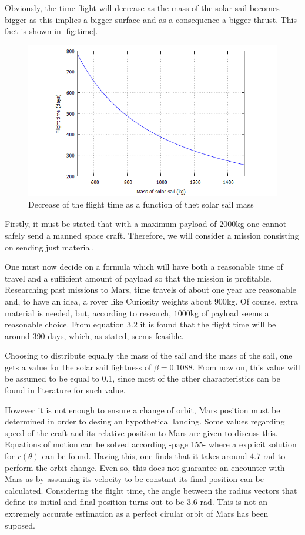 \documentclass[twocolumn,12pt,a4paper]{article}
\numberwithin{equation}{section}
\begin{document}
Obviously, the time flight will decrease as the mass of the solar sail becomes bigger as this implies a bigger surface and as a consequence a bigger thrust. This fact is shown in \autoref{fig:time}.
\begin{figure}[h]
	\centering
	\includegraphics[scale=0.35]{time}
	\caption{\small Decrease of the flight time as a function of thet  solar sail mass}
	\label{fig:time}
\end{figure}

Firstly, it must be stated that with a maximum payload of $2000$kg one cannot safely send a manned space craft. Therefore, we will consider a mission consisting on sending just material.

One must now decide on a formula which will have both a reasonable time of travel and a sufficient amount of payload so that the mission is profitable. Researching past missions to Mars, time travels of about one year are reasonable and, to have an idea, a rover like Curiosity weights about $900$kg. Of course, extra material is needed, but, according to research, $1000$kg of payload seems a reasonable choice. From equation 3.2 it is found that the flight time will be around 390 days, which, as stated, seems feasible.

Choosing to distribute equally the mass of the sail and the mass of the sail, one gets a value for the solar sail lightness of $\beta=0.1088$. From now on, this value will be assumed to be equal to 0.1, since most of the other characteristics can be found in literature for such value.

However it is not enough to ensure a change of orbit, Mars position must be determined in order to desing an hypothetical landing. Some values regarding speed of the craft and its relative position to Mars are given to discuss this. Equations of motion can be solved according \cite{mcinnes} -page 155- where a explicit solution for $r(\theta)$ can be found. Having this, one finds that it takes around $4.7$ rad to perform the orbit change. Even so, this does not guarantee an encounter with Mars as by assuming its velocity to be constant its final position can be calculated. Considering the flight time, the angle between the radius vectors that define its initial and final position turns out to be $3.6$ rad. This is not an extremely accurate estimation as a perfect cirular orbit of Mars has been suposed.
\end{document}
